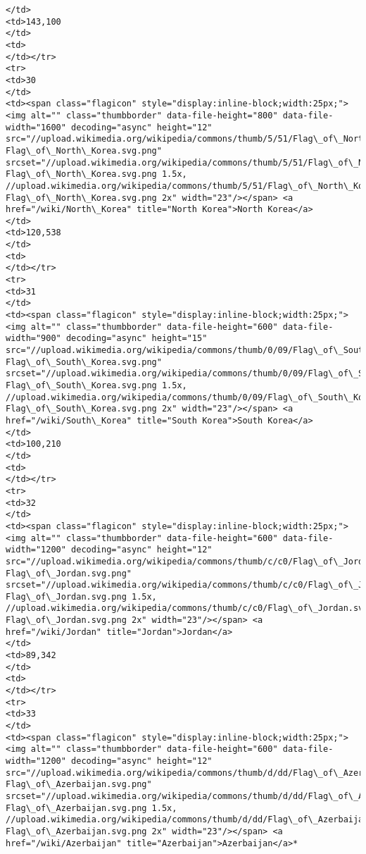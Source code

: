 \documentclass[11pt]{article}
\begin{document}
\begin{Verbatim}[commandchars=\\\{\}]
</td>
<td>143,100
</td>
<td>
</td></tr>
<tr>
<td>30
</td>
<td><span class="flagicon" style="display:inline-block;width:25px;"><img alt="" class="thumbborder" data-file-height="800" data-file-width="1600" decoding="async" height="12" src="//upload.wikimedia.org/wikipedia/commons/thumb/5/51/Flag\_of\_North\_Korea.svg/23px-Flag\_of\_North\_Korea.svg.png" srcset="//upload.wikimedia.org/wikipedia/commons/thumb/5/51/Flag\_of\_North\_Korea.svg/35px-Flag\_of\_North\_Korea.svg.png 1.5x, //upload.wikimedia.org/wikipedia/commons/thumb/5/51/Flag\_of\_North\_Korea.svg/46px-Flag\_of\_North\_Korea.svg.png 2x" width="23"/></span> <a href="/wiki/North\_Korea" title="North Korea">North Korea</a>
</td>
<td>120,538
</td>
<td>
</td></tr>
<tr>
<td>31
</td>
<td><span class="flagicon" style="display:inline-block;width:25px;"><img alt="" class="thumbborder" data-file-height="600" data-file-width="900" decoding="async" height="15" src="//upload.wikimedia.org/wikipedia/commons/thumb/0/09/Flag\_of\_South\_Korea.svg/23px-Flag\_of\_South\_Korea.svg.png" srcset="//upload.wikimedia.org/wikipedia/commons/thumb/0/09/Flag\_of\_South\_Korea.svg/35px-Flag\_of\_South\_Korea.svg.png 1.5x, //upload.wikimedia.org/wikipedia/commons/thumb/0/09/Flag\_of\_South\_Korea.svg/45px-Flag\_of\_South\_Korea.svg.png 2x" width="23"/></span> <a href="/wiki/South\_Korea" title="South Korea">South Korea</a>
</td>
<td>100,210
</td>
<td>
</td></tr>
<tr>
<td>32
</td>
<td><span class="flagicon" style="display:inline-block;width:25px;"><img alt="" class="thumbborder" data-file-height="600" data-file-width="1200" decoding="async" height="12" src="//upload.wikimedia.org/wikipedia/commons/thumb/c/c0/Flag\_of\_Jordan.svg/23px-Flag\_of\_Jordan.svg.png" srcset="//upload.wikimedia.org/wikipedia/commons/thumb/c/c0/Flag\_of\_Jordan.svg/35px-Flag\_of\_Jordan.svg.png 1.5x, //upload.wikimedia.org/wikipedia/commons/thumb/c/c0/Flag\_of\_Jordan.svg/46px-Flag\_of\_Jordan.svg.png 2x" width="23"/></span> <a href="/wiki/Jordan" title="Jordan">Jordan</a>
</td>
<td>89,342
</td>
<td>
</td></tr>
<tr>
<td>33
</td>
<td><span class="flagicon" style="display:inline-block;width:25px;"><img alt="" class="thumbborder" data-file-height="600" data-file-width="1200" decoding="async" height="12" src="//upload.wikimedia.org/wikipedia/commons/thumb/d/dd/Flag\_of\_Azerbaijan.svg/23px-Flag\_of\_Azerbaijan.svg.png" srcset="//upload.wikimedia.org/wikipedia/commons/thumb/d/dd/Flag\_of\_Azerbaijan.svg/35px-Flag\_of\_Azerbaijan.svg.png 1.5x, //upload.wikimedia.org/wikipedia/commons/thumb/d/dd/Flag\_of\_Azerbaijan.svg/46px-Flag\_of\_Azerbaijan.svg.png 2x" width="23"/></span> <a href="/wiki/Azerbaijan" title="Azerbaijan">Azerbaijan</a>*

\end{Verbatim}
\end{document}
